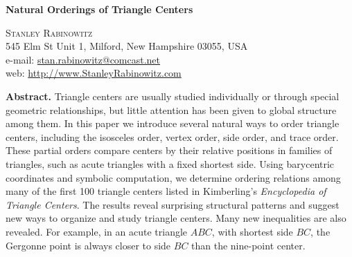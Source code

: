 \documentclass[12pt,a4paper]{amsart}
\begin{document}

\bigskip
\bigskip

\begin{center}
	{\Large \textbf{Natural Orderings of Triangle Centers} }\\
	\medskip
	\bigskip
        \bigskip

	\textsc{Stanley Rabinowitz} \\

	545 Elm St Unit 1,  Milford, New Hampshire 03055, USA \\
	e-mail: \href{mailto:stan.rabinowitz@comcast.net}{stan.rabinowitz@comcast.net}
	\\web: \url{http://www.StanleyRabinowitz.com} \\
	

\bigskip
\bigskip

\end{center}
\bigskip

\textbf{Abstract.}
Triangle centers are usually studied individually or through special geometric relationships, but little attention has been given to global structure among them. In this paper we introduce several natural ways to order triangle centers, including the isosceles order, vertex order, side order, and trace order. These partial orders compare centers by their relative positions in families of triangles, such as acute triangles with a fixed shortest side. Using barycentric coordinates and symbolic computation, we determine ordering relations among many of the first 100 triangle centers listed in Kimberling's \emph{Encyclopedia of Triangle Centers}. The results reveal surprising structural patterns and suggest new ways to organize and study triangle centers. Many new inequalities are also revealed. For example, in an acute triangle $ABC$, with shortest side $BC$, the Gergonne point is always closer to side $BC$ than the nine-point center.
\end{document}
